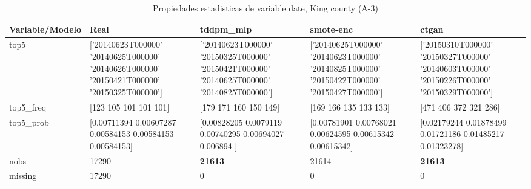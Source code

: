 \begin{table}[H]
\centering
\fontsize{8}{14}\selectfont
\caption{Propiedades  estadisticas de variable date, King county (A-3)}
\label{table-stats-king county-a-3-date}
\begin{tabular}{|l|m{10em}|m{10em}|m{10em}|m{10em}|}
\hline
 \rowcolor[gray]{0.8}
Variable/Modelo & Real & tddpm\_mlp & smote-enc & ctgan \\
\hline top5 & ['20140623T000000' '20140625T000000' '20140626T000000' '20150421T000000'
 '20150325T000000'] & ['20140623T000000' '20150325T000000' '20150421T000000' '20140625T000000'
 '20140825T000000'] & ['20140625T000000' '20140623T000000' '20140825T000000' '20150422T000000'
 '20150427T000000'] & ['20150310T000000' '20150327T000000' '20140603T000000' '20150226T000000'
 '20150329T000000'] \\
\hline top5\_freq & [123 105 101 101 101] & [179 171 160 150 149] & [169 166 135 133 133] & [471 406 372 321 286] \\
\hline top5\_prob & [0.00711394 0.00607287 0.00584153 0.00584153 0.00584153] & [0.00828205 0.0079119  0.00740295 0.00694027 0.006894  ] & [0.00781901 0.00768021 0.00624595 0.00615342 0.00615342] & [0.02179244 0.01878499 0.01721186 0.01485217 0.01323278] \\
\hline nobs & 17290 & \bfseries 21613 & \cellcolor[rgb]{0.9, 0.54, 0.52} 21614 & \bfseries 21613 \\
\hline missing & 17290 & 0 & 0 & 0 \\
\hline
\end{tabular}
\end{table}

